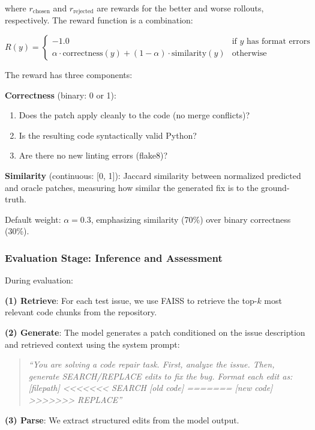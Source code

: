 \documentclass{article} %
\begin{document}
where $r_{\text{chosen}}$ and $r_{\text{rejected}}$ are rewards for the better and worse rollouts, respectively. The reward function is a combination:

\begin{equation}
R(y) = \begin{cases}
-1.0 & \text{if } y \text{ has format errors} \\
\alpha \cdot \text{correctness}(y) + (1-\alpha) \cdot \text{similarity}(y) & \text{otherwise}
\end{cases}
\end{equation}

The reward has three components:

\textbf{Correctness} (binary: 0 or 1):
\begin{enumerate}
    \item Does the patch apply cleanly to the code (no merge conflicts)?
    \item Is the resulting code syntactically valid Python?
    \item Are there no new linting errors (flake8)?
\end{enumerate}

\textbf{Similarity} (continuous: [0, 1]):
Jaccard similarity between normalized predicted and oracle patches, measuring how similar the generated fix is to the ground-truth.

Default weight: $\alpha = 0.3$, emphasizing similarity (70\%) over binary correctness (30\%).

\subsubsection{Evaluation Stage: Inference and Assessment}

During evaluation:

\textbf{(1) Retrieve}: For each test issue, we use FAISS to retrieve the top-$k$ most relevant code chunks from the repository.

\textbf{(2) Generate}: The model generates a patch conditioned on the issue description and retrieved context using the system prompt:

\begin{quote}
\textit{``You are solving a code repair task. First, analyze the issue. Then, generate SEARCH/REPLACE edits to fix the bug. Format each edit as: [filepath] <<<<<<< SEARCH [old code] ======= [new code] >>>>>>> REPLACE''}
\end{quote}

\textbf{(3) Parse}: We extract structured edits from the model output.
\end{document}
